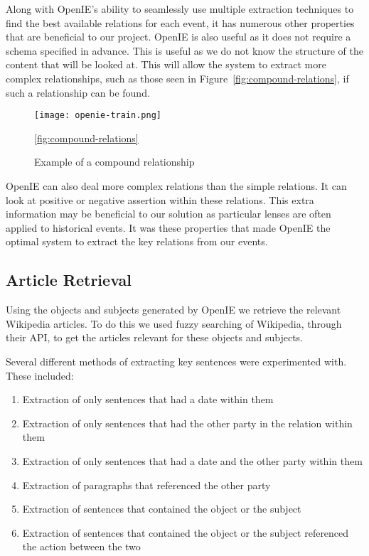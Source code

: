 \documentclass[bsc,frontabs,twoside,singlespacing,parskip,deptreport]{infthesis}     %
\begin{document}
Along with OpenIE's ability to seamlessly use multiple extraction techniques to find the best available
relations for each event, it has numerous other properties that are beneficial to our project.
OpenIE is also useful as it does not require a schema specified in advance.
This is useful as we do not know the structure of the content that will be looked at.
This will allow the system to extract
more complex relationships, such as those seen in Figure~\ref{fig:compound-relations}, if such
a relationship can be found.


\begin{figure}[h]
  \centering
  \texttt{[image: openie-train.png]}
  \caption{Example of a compound relationship ~\cite{OpenIE}}
  \ref{fig:compound-relations}
  \end{figure}

OpenIE can also deal more complex relations  than the simple relations.
It can look at positive or negative assertion within these relations.
This extra information may be beneficial to our solution as particular lenses are often applied to historical events.
It was these properties that made OpenIE the optimal system to extract the key relations from our events.


\subsection{Article Retrieval}
Using the objects and subjects generated by OpenIE we retrieve the relevant Wikipedia articles.
To do this we used fuzzy searching of Wikipedia, through their API, to get the articles relevant
for these objects and subjects.

Several different methods of extracting key sentences were experimented with.
These included:

\begin{enumerate}
  \item Extraction of only sentences that had a date within them
  \item Extraction of only sentences that had the other party in the relation within them
  \item Extraction of only sentences that had a date and the other party within them
  \item Extraction of paragraphs that referenced the other party
  \item Extraction of sentences that contained the object or the subject 
  \item Extraction of sentences that contained the object or the subject referenced the action between the two 
\end{enumerate}
\end{document}
